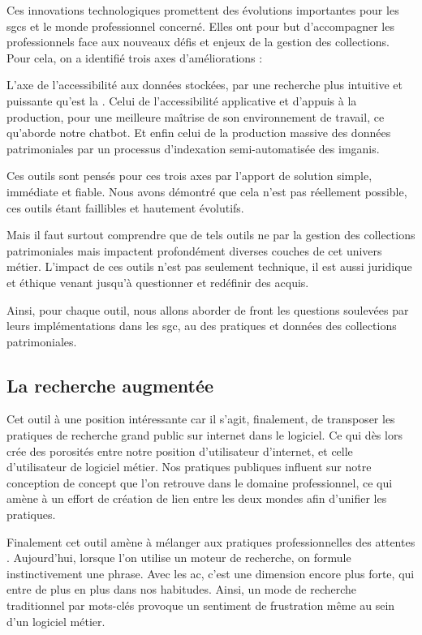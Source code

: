 
Ces innovations technologiques promettent des évolutions importantes pour les \glspl{sgc} et le monde professionnel concerné. Elles ont pour but d'accompagner les professionnels face aux nouveaux défis et enjeux de la gestion des collections. Pour cela, on a identifié trois axes d'améliorations :

L'axe de l'accessibilité aux données stockées, par une recherche plus intuitive et puissante qu'est la . Celui de l'accessibilité applicative et d'appuis à la production, pour une meilleure maîtrise de son environnement de travail, ce qu'aborde notre \gls{chatbot}. Et enfin celui de la production massive des données patrimoniales par un processus d'indexation semi-automatisée des \glspl{imgani}.\newline

Ces outils sont pensés pour  ces trois axes par l'apport de solution simple, immédiate et fiable. Nous avons démontré que cela n'est pas réellement possible, ces outils étant faillibles et hautement évolutifs.  

Mais il faut surtout comprendre que de tels outils ne  par la gestion des collections patrimoniales mais impactent profondément diverses couches de cet univers métier. L'impact de ces outils n'est pas seulement technique, il est aussi juridique et éthique venant jusqu'à questionner et redéfinir des acquis.

Ainsi, pour chaque outil, nous allons aborder de front les questions soulevées par leurs implémentations dans les \gls{sgc}, au \coeur des pratiques et données des collections patrimoniales.

\subsection{La recherche augmentée}

Cet outil à une position intéressante car il s'agit, finalement, de transposer les pratiques de recherche grand public sur internet dans le logiciel. Ce qui dès lors crée des porosités entre notre position d'utilisateur d'internet, et celle d'utilisateur de logiciel métier. Nos pratiques publiques influent sur notre conception de concept que l'on retrouve dans le domaine professionnel, ce qui amène à un effort de création de lien entre les deux mondes afin d'unifier les pratiques.

Finalement cet outil amène à mélanger aux pratiques professionnelles des attentes . Aujourd'hui, lorsque l'on utilise un moteur de recherche, on formule instinctivement une phrase. Avec les \gls{ac}, c'est une dimension encore plus forte, qui entre de plus en plus dans nos habitudes. Ainsi, un mode de recherche traditionnel par mots-clés provoque un sentiment de frustration même au sein d'un logiciel métier. 

